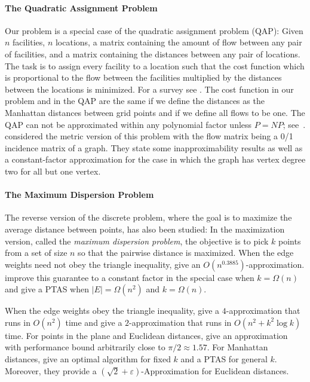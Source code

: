 \documentclass[preprint,authoryear,12pt]{elsarticle}
\begin{document}
\paragraph{The Quadratic Assignment Problem}
Our problem is a special case of the quadratic assignment problem
(QAP): Given $n$ facilities, $n$ locations, a matrix containing the
amount of flow between any pair of facilities, and a matrix
containing the distances between any pair of locations. The task is
to assign every facility to a location such that the cost function
which is proportional to the flow between the facilities multiplied
by the distances between the locations is minimized. For a survey
see \cite{loiola07}. The cost function in our problem and in the
QAP are the same if we define the distances as the Manhattan
distances between grid points and if we define all flows to be one.
The QAP can not be approximated within any polynomial factor unless
$P=NP$; see~\cite{sahni76}.
\cite{hls-amqap-09}
considered the metric version of this problem with the flow matrix
being a 0/1 incidence matrix of a graph. They state some
inapproximability results as well as a constant-factor approximation
for the case in which the graph has vertex degree two for all but
one vertex.


\paragraph{The Maximum Dispersion Problem}
The reverse version of the discrete problem, where the goal is to
maximize the average distance between points, has also been studied:
In the maximization version, called the \emph{maximum dispersion
problem}, the objective is to pick $k$ points from a set of size $n$
so that the pairwise distance is maximized. When the edge weights
need not obey the triangle inequality, \cite{kp-cds-93} give an $O(n^{0.3885})$-approximation. \cite{aitt-gfds-00} improve this guarantee to a constant factor in
the special case when $k=\Omega(n)$ and \cite{akk-ptasd-99} give a PTAS when $|E|=\Omega(n^2)$ and
$k=\Omega(n)$.

When the edge weights obey the triangle inequality, \cite{rrt-hscad-94} give a $4$-approximation that runs in $O(n^2)$
time and \cite{hrt-aamd-97} give a $2$-approximation that runs in
$O(n^2+k^2\log k)$ time. For points in the plane and Euclidean
distances, \cite{rrt-hscad-94} give an approximation with performance bound
arbitrarily close to $\pi/2\approx 1.57$. For Manhattan distances,
\cite{fm-mdgmwc-04} give an optimal algorithm for fixed $k$ and a
PTAS for general $k$. Moreover, they provide a
$(\sqrt{2}+\varepsilon)$-Approximation for Euclidean distances.
\end{document}
